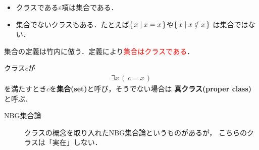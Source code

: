 	\begin{itemize}
		\item クラスである$\varepsilon$項は集合である．
		\item 集合でないクラスもある．たとえば$\left\{\, x \mid x = x\, \right\}$や$\left\{\, x \mid x \notin x\, \right\}$
			は集合ではない．
	\end{itemize}
	
	\vspace{\baselineskip}
	集合の定義は竹内\cite{}に倣う．定義により\textcolor{red}{集合はクラスである}．
	\begin{screen}
		\begin{dfn}[集合]
			クラス$c$が
			\begin{align}
				\exists x\, (\, c = x\, )
			\end{align}
			を満たすとき$c$を{\bf 集合(set)}と呼び，そうでない場合は
			{\bf 真クラス(proper class)}と呼ぶ．
		\end{dfn}
	\end{screen}
	
	\begin{description}
		\item[NBG集合論] クラスの概念を取り入れたNBG集合論というものがあるが，
			こちらのクラスは「実在」しない．
	\end{description}
